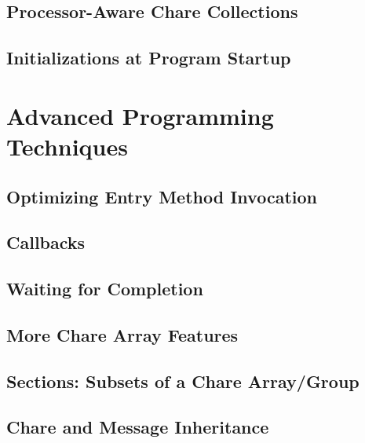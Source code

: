 \documentclass[10pt]{report}
\begin{document}
\chapter{Processor-Aware Chare Collections}
  
  

\chapter{Initializations at Program Startup}
  

\part{Advanced Programming Techniques}

\chapter{Optimizing Entry Method Invocation}
  
  
  
  

\chapter{Callbacks}
  

\chapter{Waiting for Completion}
  
  
  
  

\chapter{More Chare Array Features}
\label{advanced arrays}
  

\chapter{Sections: Subsets of a Chare Array/Group}
\label{array section}
  

\chapter{Chare and Message Inheritance}
\label{inheritance}
  
\end{document}
